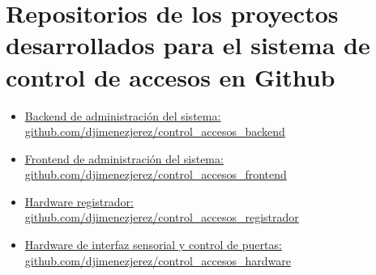 \documentclass[../principal]{subfiles}
\begin{document}
  \tocless\section{Repositorios de los proyectos desarrollados para el sistema de control de accesos en Github}\label{anx:repositorios_github}\hfill
  
  \begin{itemize}
  \item \href{https://github.com/djimenezjerez/control_accesos_backend}{Backend de administración del sistema:\\ github.com/djimenezjerez/control\_accesos\_backend}
  \item \href{https://github.com/djimenezjerez/control_accesos_frontend}{Frontend de administración del sistema:\\ github.com/djimenezjerez/control\_accesos\_frontend}
  \item \href{https://github.com/djimenezjerez/control_accesos_registrador}{Hardware registrador:\\ github.com/djimenezjerez/control\_accesos\_registrador}
  \item \href{https://github.com/djimenezjerez/control_accesos_hardware}{Hardware de interfaz sensorial y control de puertas:\\ github.com/djimenezjerez/control\_accesos\_hardware}
  \end{itemize}

  

  
\end{document}
